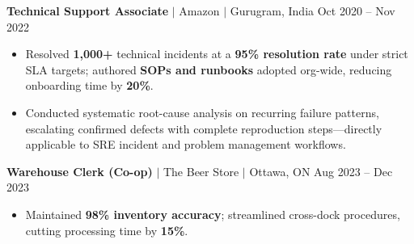 \documentclass[11pt,a4paper]{article}
\begin{document}
\textbf{Technical Support Associate} $|$ Amazon $|$ Gurugram, India \hfill Oct 2020 -- Nov 2022
\begin{itemize}
    \item Resolved \textbf{1,000+} technical incidents at a \textbf{95\% resolution rate} under strict SLA targets; authored \textbf{SOPs and runbooks} adopted org-wide, reducing onboarding time by \textbf{20\%}.
    \item Conducted systematic root-cause analysis on recurring failure patterns, escalating confirmed defects with complete reproduction steps---directly applicable to SRE incident and problem management workflows.
\end{itemize}

\vspace{4pt}

\textbf{Warehouse Clerk (Co-op)} $|$ The Beer Store $|$ Ottawa, ON \hfill Aug 2023 -- Dec 2023
\begin{itemize}
    \item Maintained \textbf{98\% inventory accuracy}; streamlined cross-dock procedures, cutting processing time by \textbf{15\%}.
\end{itemize}
\end{document}

